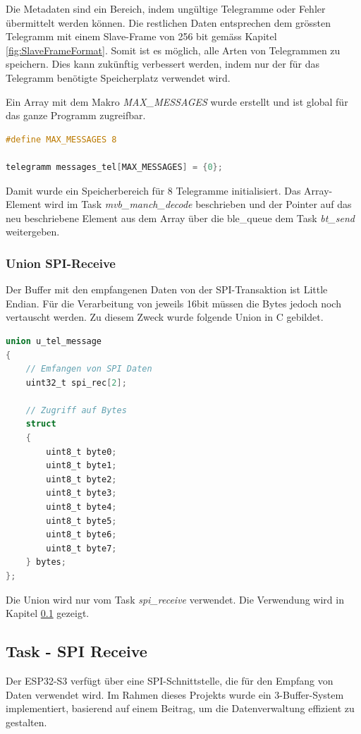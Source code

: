 Die Metadaten sind ein Bereich, indem ungültige Telegramme oder Fehler übermittelt werden können. Die restlichen Daten entsprechen dem grössten Telegramm mit einem Slave-Frame von 256 bit gemäss Kapitel \ref{fig:SlaveFrameFormat}. Somit ist es möglich, alle Arten von Telegrammen zu speichern. Dies kann zukünftig verbessert werden, indem nur der für das Telegramm benötigte Speicherplatz verwendet wird. 

Ein Array mit dem Makro \textit{MAX\_MESSAGES} wurde erstellt und ist global für das ganze Programm zugreifbar. 

\begin{lstlisting}[language=C]
#define MAX_MESSAGES 8

telegramm messages_tel[MAX_MESSAGES] = {0};
\end{lstlisting}

Damit wurde ein Speicherbereich für 8 Telegramme initialisiert. Das Array-Element wird im Task \textit{mvb\_manch\_decode} beschrieben und der Pointer auf das neu beschriebene Element aus dem Array über die ble\_queue dem Task \textit{bt\_send} weitergeben. 


\subsubsection{Union SPI-Receive}
\label{subsub:UnionSPI}

Der Buffer mit den empfangenen Daten von der SPI-Transaktion ist Little Endian. Für die Verarbeitung von jeweils 16bit müssen die Bytes jedoch noch vertauscht werden. Zu diesem Zweck wurde folgende Union in C gebildet.

\begin{lstlisting}[language=C]
union u_tel_message
{
    // Emfangen von SPI Daten
    uint32_t spi_rec[2];

    // Zugriff auf Bytes
    struct 
    {
        uint8_t byte0;
        uint8_t byte1;
        uint8_t byte2;
        uint8_t byte3;
        uint8_t byte4;
        uint8_t byte5;
        uint8_t byte6;
        uint8_t byte7;
    } bytes;
};
\end{lstlisting}

Die Union wird nur vom Task \textit{spi\_receive} verwendet. Die Verwendung wird in Kapitel \ref{sub:TaskSPIReceive} gezeigt. 


\subsection{Task - SPI Receive}
\label{sub:TaskSPIReceive}
Der ESP32-S3 verfügt über eine SPI-Schnittstelle, die für den Empfang von Daten verwendet wird. Im Rahmen dieses Projekts wurde ein 3-Buffer-System implementiert, basierend auf einem Beitrag, um die Datenverwaltung effizient zu gestalten. 

